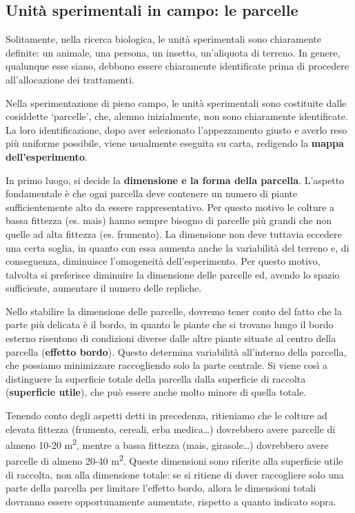 \documentclass[a4paper,12pt,oneside]{book}
\theoremstyle{definition}
\theoremstyle{definition}
\theoremstyle{definition}
\theoremstyle{remark}
\begin{document}
\subsection{Unità sperimentali in campo: le
parcelle}\label{unita-sperimentali-in-campo-le-parcelle}

Solitamente, nella ricerca biologica, le unità sperimentali sono
chiaramente definite: un animale, una persona, un insetto, un'aliquota
di terreno. In genere, qualunque esse siano, debbono essere chiaramente
identificate prima di procedere all'allocazione dei trattamenti.

Nella sperimentazione di pieno campo, le unità sperimentali sono
costituite dalle cosiddette `parcelle', che, alemno inizialmente, non
sono chiaramente identificate. La loro identificazione, dopo aver
selezionato l'appezzamento giusto e averlo reso più uniforme possibile,
viene usualmente eseguita su carta, redigendo la \textbf{mappa
dell'esperimento}.

In primo luogo, si decide la \textbf{dimensione e la forma della
parcella}. L'aspetto fondamentale è che ogni parcella deve contenere un
numero di piante sufficientemente alto da essere rappresentativo. Per
questo motivo le colture a bassa fittezza (es. mais) hanno sempre
bisogno di parcelle più grandi che non quelle ad alta fittezza (es.
frumento). La dimensione non deve tuttavia eccedere una certa soglia, in
quanto con essa aumenta anche la variabilità del terreno e, di
conseguenza, diminuisce l'omogeneità dell'esperimento. Per questo
motivo, talvolta si preferisce diminuire la dimensione delle parcelle
ed, avendo lo spazio sufficiente, aumentare il numero delle repliche.

Nello stabilire la dimensione delle parcelle, dovremo tener conto del
fatto che la parte più delicata è il bordo, in quanto le piante che si
trovano lungo il bordo esterno risentono di condizioni diverse dalle
altre piante situate al centro della parcella (\textbf{effetto bordo}).
Questo determina variabilità all'interno della parcella, che possiamo
minimizzare raccogliendo solo la parte centrale. Si viene così a
distinguere la superficie totale della parcella dalla superficie di
raccolta (\textbf{superficie utile}), che può essere anche molto minore
di quella totale.

Tenendo conto degli aspetti detti in precedenza, ritieniamo che le
colture ad elevata fittezza (frumento, cereali, erba medica\ldots{})
dovrebbero avere parcelle di almeno 10-20 m\textsuperscript{2}, mentre a
bassa fittezza (mais, girasole\ldots{}) dovrebbero avere parcelle di
almeno 20-40 m\textsuperscript{2}. Queste dimensioni sono riferite alla
superficie utile di raccolta, non alla dimensione totale: se si ritiene
di dover raccogliere solo una parte della parcella per limitare
l'effetto bordo, allora le dimensioni totali dovranno essere
opportunamente aumentate, rispetto a quanto indicato sopra.
\end{document}
